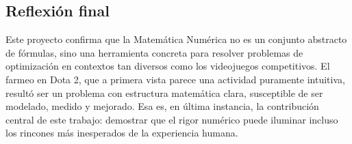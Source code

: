 \subsection{Reflexión final}

Este proyecto confirma que la Matemática Numérica no es un conjunto abstracto de fórmulas, sino una herramienta concreta para resolver problemas de optimización en contextos tan diversos como los videojuegos competitivos. El farmeo en Dota 2, que a primera vista parece una actividad puramente intuitiva, resultó ser un problema con estructura matemática clara, susceptible de ser modelado, medido y mejorado. Esa es, en última instancia, la contribución central de este trabajo: demostrar que el rigor numérico puede iluminar incluso los rincones más inesperados de la experiencia humana.